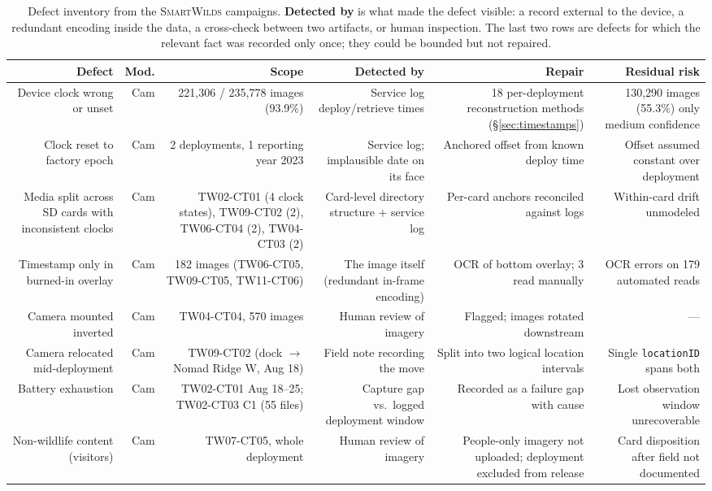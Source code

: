 \documentclass[sigconf]{acmart}
\newcommand{\smartwilds}{\textsc{SmartWilds}\xspace}
\begin{document}
\begin{table}[t]
\caption{Defect inventory from the \smartwilds campaigns.
\textbf{Detected by} is what made the defect visible: a record external
to the device, a redundant encoding inside the data, a cross-check
between two artifacts, or human inspection. The last two rows are
defects for which the relevant fact was recorded only once; they could
be bounded but not repaired.}
\label{tab:defects}
\footnotesize
\begin{tabularx}{\textwidth}{R{1.09}R{0.39}R{1.09}R{1.09}R{1.17}R{1.17}}
\toprule
\textbf{Defect} & \textbf{Mod.} & \textbf{Scope} & \textbf{Detected by} & \textbf{Repair} & \textbf{Residual risk} \\
\midrule
Device clock wrong or unset & Cam & 221{,}306 / 235{,}778 images (93.9\%) & Service log deploy/retrieve times & 18 per-deployment reconstruction methods (\S\ref{sec:timestamps}) & 130{,}290 images (55.3\%) only medium confidence \\
Clock reset to factory epoch & Cam & 2 deployments, 1 reporting year 2023 & Service log; implausible date on its face & Anchored offset from known deploy time & Offset assumed constant over deployment \\
Media split across SD cards with inconsistent clocks & Cam & TW02-CT01 (4 clock states), TW09-CT02 (2), TW06-CT04 (2), TW04-CT03 (2) & Card-level directory structure + service log & Per-card anchors reconciled against logs & Within-card drift unmodeled \\
Timestamp only in burned-in overlay & Cam & 182 images (TW06-CT05, TW09-CT05, TW11-CT06) & The image itself (redundant in-frame encoding) & OCR of bottom overlay; 3 read manually & OCR errors on 179 automated reads \\
Camera mounted inverted & Cam & TW04-CT04, 570 images & Human review of imagery & Flagged; images rotated downstream & --- \\
Camera relocated mid-deployment & Cam & TW09-CT02 (dock $\to$ Nomad Ridge W, Aug 18) & Field note recording the move & Split into two logical location intervals & Single \texttt{locationID} spans both \\
Battery exhaustion & Cam & TW02-CT01 Aug 18--25; TW02-CT03 C1 (55 files) & Capture gap vs.\ logged deployment window & Recorded as a failure gap with cause & Lost observation window unrecoverable \\
Non-wildlife content (visitors) & Cam & TW07-CT05, whole deployment & Human review of imagery & People-only imagery not uploaded; deployment excluded from release & Card disposition after field not documented \\

\end{tabularx}
\end{table}
\end{document}
